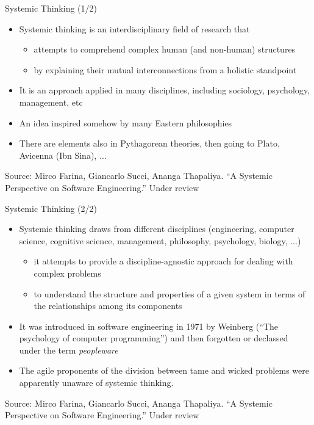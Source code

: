 \documentclass{beamer}
\begin{document}
\begin{frame}
{\centerline{Systemic Thinking (1/2)}}

\begin{itemize}
\item Systemic thinking is an interdisciplinary field of research that 
\begin{itemize}
\item attempts to comprehend complex human (and non-human) structures
\item by explaining their mutual interconnections from a holistic standpoint
\end{itemize}
\item It is an approach applied in many disciplines, including sociology, psychology, management, etc
\item An idea inspired somehow by many Eastern philosophies
\item There are elements also in Pythagorean theories, then going to Plato, Avicenna (Ibn Sina), $\ldots{}$
\end{itemize}

\begin{center}
    \tiny{Source: Mirco Farina, Giancarlo Succi, Ananga Thapaliya. ``A Systemic Perspective on Software Engineering.'' Under review}
\end{center}

\end{frame}

\begin{frame}
{\centerline{Systemic Thinking (2/2)}}

\begin{itemize}
\item Systemic thinking draws from different disciplines  (engineering, computer science,  cognitive science,  management, philosophy, psychology, biology, ...)
\begin{itemize}
\item  it attempts to provide a discipline-agnostic approach for dealing with complex  problems
\item  to understand the structure and properties of a given system in terms of the relationships among its components
\end{itemize}
\item It was introduced in software engineering in 1971 by Weinberg (``The psychology of computer programming'') and then forgotten or declassed under the term \textit{peopleware}
\item The agile proponents of the division between tame and wicked problems were apparently unaware of systemic thinking.
\end{itemize}

\begin{center}
    \tiny{Source: Mirco Farina, Giancarlo Succi, Ananga Thapaliya. ``A Systemic Perspective on Software Engineering.'' Under review}
\end{center}

\end{frame}
\end{document}
